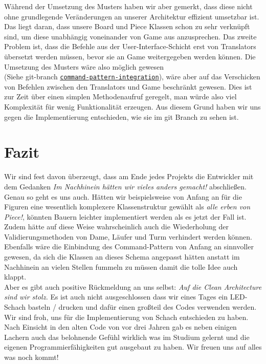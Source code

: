 \documentclass[
10pt, %
a4paper, %
oneside, %
headinclude,footinclude, %
BCOR5mm, %
]{scrartcl}
\begin{document}
\begin{onehalfspace}
Während der Umsetzung des Musters haben wir aber gemerkt, dass diese nicht ohne grundlegende Veränderungen an unserer Architektur effizient umsetzbar ist. Das liegt daran, dass unsere Board und Piece Klassen schon zu sehr verknüpft sind, um diese unabhängig voneinander von Game aus anzusprechen.
Das zweite Problem ist, dass die Befehle aus der User-Interface-Schicht erst von Translators übersetzt werden müssen, bevor sie an Game weitergegeben werden können. Die Umsetzung des Musters wäre also möglich gewesen \\(Siehe git-branch \texttt{\href{https://github.com/schmida736/Chess-AdvancedSE/tree/command-pattern-integration}{command-pattern-integration}}), wäre aber auf das Verschicken von Befehlen zwischen den Translators und Game beschränkt gewesen. Dies ist zur Zeit über einen simplen Methodenaufruf geregelt, man würde also viel Komplexität für wenig Funktionalität erzeugen. Aus diesem Grund haben wir uns gegen die Implementierung entschieden, wie sie im git Branch zu sehen ist.
\newpage
\section{Fazit}
\label{sec:end}

Wir sind fest davon überzeugt, dass am Ende jedes Projekts die Entwickler mit dem Gedanken \textit{Im Nachhinein hätten wir vieles anders gemacht!} abschließen. Genau so geht es uns auch. Hätten wir beispielsweise von Anfang an für die Figuren eine wesentlich komplexere Klassenstruktur gewählt als \textit{alle erben von Piece!}, könnten Bauern leichter implementiert werden als es jetzt der Fall ist. Zudem hätte auf diese Weise wahrscheinlich auch die Wiederholung der Validierungsmethoden von Dame, Läufer und Turm verhindert werden können. \\
Ebenfalls wäre die Einbindung des Command-Pattern von Anfang an sinnvoller gewesen, da sich die Klassen an dieses Schema angepasst hätten anstatt im Nachhinein an vielen Stellen fummeln zu müssen damit die tolle Idee auch klappt. \\
Aber es gibt auch positive Rückmeldung an uns selbst: \textit{Auf die Clean Architecture sind wir stolz.} Es ist auch nicht ausgeschlossen dass wir eines Tages ein LED-Schach basteln / drucken und dafür einen großteil des Codes verwenden werden.\\
Wir sind froh, uns für die Implementierung von Schach entschieden zu haben. Nach Einsicht in den alten Code von vor drei Jahren gab es neben einigen Lachern auch das belohnende Gefühl wirklich was im Studium gelernt und die eigenen Programmierfähigkeiten gut ausgebaut zu haben. Wir freuen uns auf alles was noch kommt!


\end{onehalfspace}
\end{document}
